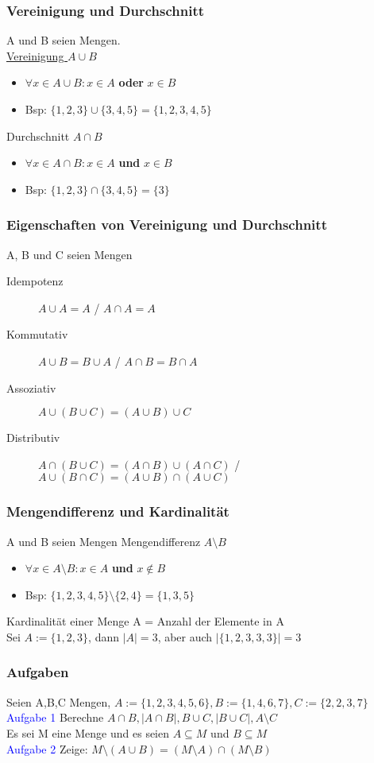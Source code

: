 \documentclass{beamer}
\begin{document}
	\begin{frame}
		\frametitle{Vereinigung und Durchschnitt}
		A und B seien Mengen.\\
		\underline{Vereinigung $A\cup B$}
		\begin{itemize}
			\item $\forall x\in A\cup B: x\in A$ \textbf{oder} $x\in B$
			\item Bsp: $\{1, 2, 3\}\cup \{3, 4, 5\} = \{1, 2, 3, 4, 5\}$
		\end{itemize}
		Durchschnitt $A\cap B$
		\begin{itemize}
			\item $\forall x\in A\cap B: x\in A$ \textbf{und} $x\in B$
			\item Bsp: $\{1, 2, 3\}\cap \{3, 4, 5\} = \{3\}$
		\end{itemize}
	\end{frame}
	\begin{frame}
		\frametitle{Eigenschaften von Vereinigung und Durchschnitt}
		A, B und C seien Mengen
		\begin{description}
			\item[Idempotenz] $A\cup A = A$ / $A\cap A = A$
			\item[Kommutativ] $A\cup B = B\cup A$ / $A\cap B = B\cap A$
			\item[Assoziativ] $A\cup (B\cup C) = (A\cup B) \cup C$
			\item[Distributiv] $A\cap (B\cup C) = (A\cap B)\cup (A\cap C)$ / $A\cup (B\cap C) = (A\cup B)\cap (A\cup C)$
		\end{description}
	\end{frame}
	\begin{frame}
		\frametitle{Mengendifferenz und Kardinalität}
		A und B seien Mengen
		Mengendifferenz $A\setminus B$
		\begin{itemize}
			\item $\forall x\in A\setminus B: x\in A$ \textbf{und} $x\notin B$
			\item Bsp: $\{1, 2, 3, 4, 5\} \setminus \{2, 4\} = \{1, 3, 5\}$
		\end{itemize}
		Kardinalität einer Menge A = Anzahl der Elemente in A\\
		Sei $A := \{1, 2, 3\}$, dann $\lvert A\rvert = 3$, aber auch $\lvert \{1, 2, 3, 3, 3\}\rvert = 3$
	\end{frame}
	\begin{frame}
		\frametitle{Aufgaben}
		Seien A,B,C Mengen, $A := \{1, 2, 3, 4, 5, 6\}, B := \{1, 4, 6, 7\}, C := \{2, 2, 3, 7\}$\\
		\textcolor{blue}{Aufgabe 1} Berechne $A\cap B, \lvert A\cap B\rvert, B\cup C, \lvert B\cup C\rvert, A\setminus C$\\
		Es sei M eine Menge und es seien $A\subseteq M$ und $B\subseteq M$\\
		\textcolor{blue}{Aufgabe 2} Zeige: $M\setminus (A\cup B) = (M\setminus A)\cap (M\setminus B)$\\
	\end{frame}
\end{document}
